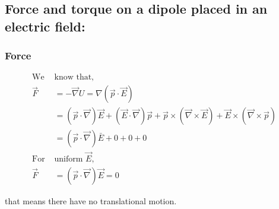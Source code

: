 \subsection{Force and torque on a dipole placed in an electric field:}
\subsubsection{Force }
\begin{align*}
\text{We  }&\text{know that,}\\
\vec{F} &=-\vec{\nabla} U=\nabla(\vec{p} \cdot \vec{E}) \\
&=(\vec{p} \cdot \vec{\nabla}) \vec{E}+(\vec{E} \cdot \vec{\nabla}) \vec{p}+\vec{p} \times(\vec{\nabla} \times \vec{E})+\vec{E} \times(\vec{\nabla} \times \vec{p}) \\
&=(\vec{p} \cdot \vec{\nabla}) \bar{E}+0+0+0\\
\text{For } &\text{uniform }\vec{E},\\
\vec{F}&=(\vec{p} \cdot \vec{\nabla}) \vec{E}=0
\end{align*}

that means there have no translational motion.
